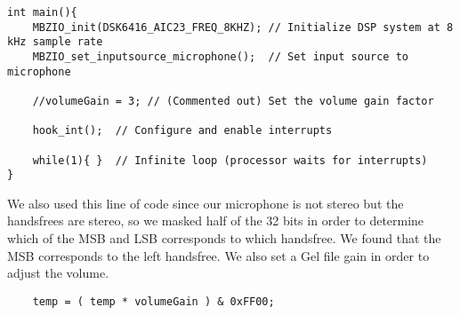 \documentclass{article}
\begin{document}
\begin{lstlisting}
int main(){
    MBZIO_init(DSK6416_AIC23_FREQ_8KHZ); // Initialize DSP system at 8 kHz sample rate
    MBZIO_set_inputsource_microphone();  // Set input source to microphone

    //volumeGain = 3; // (Commented out) Set the volume gain factor

    hook_int();  // Configure and enable interrupts

    while(1){ }  // Infinite loop (processor waits for interrupts)
}

\end{lstlisting}
We also used this line of code since our microphone is not stereo but the handsfrees are stereo, so we masked half of the 32 bits in order to determine which of the MSB and LSB corresponds to which handsfree. We found that the MSB corresponds to the left handsfree. We also set a Gel file gain in order to adjust the volume.  
\begin{lstlisting}
    temp = ( temp * volumeGain ) & 0xFF00; 
\end{lstlisting}


\end{document}

